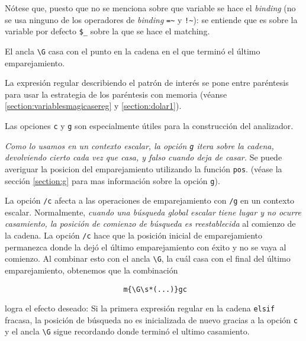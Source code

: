 
Nótese que, puesto que no se menciona sobre que variable
se hace el \emph{binding} (no se usa ninguno de los operadores
de \emph{binding} \verb|=~| y \verb|!~|): se entiende que 
es sobre la variable por defecto \verb|$_| sobre la que se 
hace el matching.


El ancla \verb|\G| 
casa con el punto en la cadena en el que terminó el último emparejamiento.

La expresión regular describiendo el patrón de interés se pone
entre paréntesis para usar la estrategia de los paréntesis
con memoria (véanse 
\ref{section:variablesmagicasereg}
y
\ref{section:dolar1}). 

Las opciones \verb|c| y \verb|g| son especialmente 
útiles para la construcción del analizador.


\emph{
Como lo usamos en un contexto escalar, la opción {\tt g} itera sobre la cadena, devolviendo
cierto cada vez que casa, y falso cuando deja de casar.} 
Se puede averiguar la posicion del emparejamiento
utilizando la función \verb|pos|. 
(véase la sección \ref{section:g} para mas información sobre la opción \verb|g|).


La opción
\verb|/c| afecta a las operaciones de emparejamiento
con \verb|/g| en un contexto escalar. Normalmente, \emph{cuando una
búsqueda global escalar tiene lugar y no ocurre casamiento,
la posici\'on de comienzo de búsqueda es reestablecida} al comienzo de
la cadena.
La opci\'on \verb|/c| hace que la posici\'on inicial de 
emparejamiento permanezca donde la dej\'o el \'ultimo
emparejamiento con \'exito y no se vaya al comienzo. 
Al combinar esto con el ancla \verb|\G|, la cuál
casa con el final del último emparejamiento, obtenemos que la combinación

\begin{verbatim}
                            m{\G\s*(...)}gc 
\end{verbatim}

logra el efecto deseado: Si la primera expresión regular
en la cadena \verb|elsif| fracasa, la posición de búsqueda no es inicializada
de nuevo gracias a la opción \verb|c| y el ancla \verb|\G| sigue recordando
donde terminó el ultimo casamiento.



